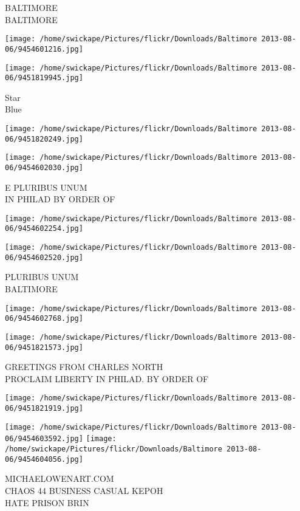 \documentclass[10pt,letterpaper]{article}
\begin{document}
BALTIMORE\\
BALTIMORE
\pagebreak

\texttt{[image: /home/swickape/Pictures/flickr/Downloads/Baltimore 2013-08-06/9454601216.jpg]}

\vspace{0.25in}
\texttt{[image: /home/swickape/Pictures/flickr/Downloads/Baltimore 2013-08-06/9451819945.jpg]}

Star\\
Blue
\pagebreak

\texttt{[image: /home/swickape/Pictures/flickr/Downloads/Baltimore 2013-08-06/9451820249.jpg]}

\vspace{0.25in}
\texttt{[image: /home/swickape/Pictures/flickr/Downloads/Baltimore 2013-08-06/9454602030.jpg]}

E PLURIBUS UNUM\\
IN PHILAD BY ORDER OF
\pagebreak

\texttt{[image: /home/swickape/Pictures/flickr/Downloads/Baltimore 2013-08-06/9454602254.jpg]}

\vspace{0.25in}
\texttt{[image: /home/swickape/Pictures/flickr/Downloads/Baltimore 2013-08-06/9454602520.jpg]}

PLURIBUS UNUM\\
BALTIMORE
\pagebreak

\texttt{[image: /home/swickape/Pictures/flickr/Downloads/Baltimore 2013-08-06/9454602768.jpg]}

\vspace{0.25in}
\texttt{[image: /home/swickape/Pictures/flickr/Downloads/Baltimore 2013-08-06/9451821573.jpg]}

GREETINGS FROM CHARLES NORTH\\
PROCLAIM LIBERTY IN PHILAD. BY ORDER OF
\pagebreak

\texttt{[image: /home/swickape/Pictures/flickr/Downloads/Baltimore 2013-08-06/9451821919.jpg]}

\vspace{0.25in}
\texttt{[image: /home/swickape/Pictures/flickr/Downloads/Baltimore 2013-08-06/9454603592.jpg]}
\texttt{[image: /home/swickape/Pictures/flickr/Downloads/Baltimore 2013-08-06/9454604056.jpg]}

MICHAELOWENART.COM\\
CHAOS 44 BUSINESS CASUAL KEPOH\\
HATE PRISON BRIN
\pagebreak
\end{document}
